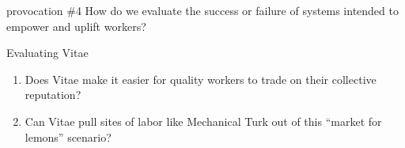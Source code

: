 \documentclass[presentation]{subfiles}
\begin{document}
\begin{frame}[standout]{provocation \#4}
  How do we \alert{evaluate} the success or failure of systems intended to empower and uplift workers?
\end{frame}


\begin{frame}{Evaluating Vitae}

  \begin{enumerate}
    \item<+-> Does Vitae make it easier for quality workers to trade on their collective reputation?
    
    \item<+-> Can Vitae pull sites of labor like Mechanical Turk out of this ``market for lemons'' scenario?

  \end{enumerate}
\end{frame}

\end{document}
